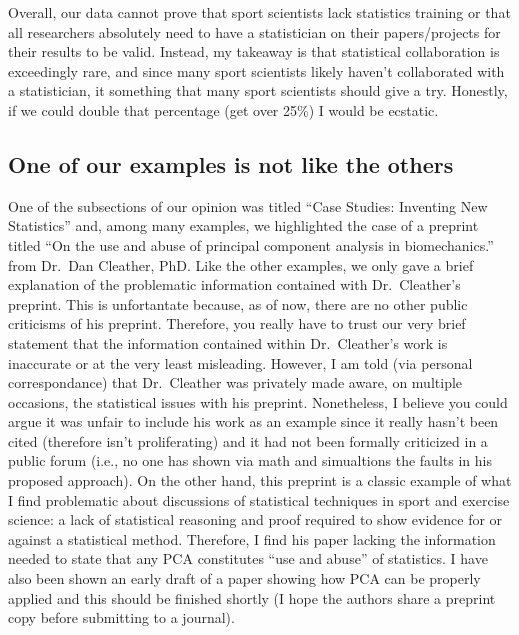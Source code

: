 \documentclass[
]{article}
\begin{document}
Overall, our data cannot prove that sport scientists lack statistics
training or that all researchers absolutely need to have a statistician
on their papers/projects for their results to be valid. Instead, my
takeaway is that statistical collaboration is exceedingly rare, and
since many sport scientists likely haven't collaborated with a
statistician, it something that many sport scientists should give a try.
Honestly, if we could double that percentage (get over 25\%) I would be
ecstatic.

\hypertarget{one-of-our-examples-is-not-like-the-others}{%
\subsection{One of our examples is not like the
others}\label{one-of-our-examples-is-not-like-the-others}}

One of the subsections of our opinion was titled ``Case Studies:
Inventing New Statistics'' and, among many examples, we highlighted the
case of a preprint titled ``On the use and abuse of principal component
analysis in biomechanics.'' from Dr.~Dan Cleather, PhD. Like the other
examples, we only gave a brief explanation of the problematic
information contained with Dr.~Cleather's preprint. This is unfortantate
because, as of now, there are no other public criticisms of his
preprint. Therefore, you really have to trust our very brief statement
that the information contained within Dr.~Cleather's work is inaccurate
or at the very least misleading. However, I am told (via personal
correspondance) that Dr.~Cleather was privately made aware, on multiple
occasions, the statistical issues with his preprint. Nonetheless, I
believe you could argue it was unfair to include his work as an example
since it really hasn't been cited (therefore isn't proliferating) and it
had not been formally criticized in a public forum (i.e., no one has
shown via math and simualtions the faults in his proposed approach). On
the other hand, this preprint is a classic example of what I find
problematic about discussions of statistical techniques in sport and
exercise science: a lack of statistical reasoning and proof required to
show evidence for or against a statistical method. Therefore, I find his
paper lacking the information needed to state that any PCA constitutes
``use and abuse'' of statistics. I have also been shown an early draft
of a paper showing how PCA can be properly applied and this should be
finished shortly (I hope the authors share a preprint copy before
submitting to a journal).
\end{document}

